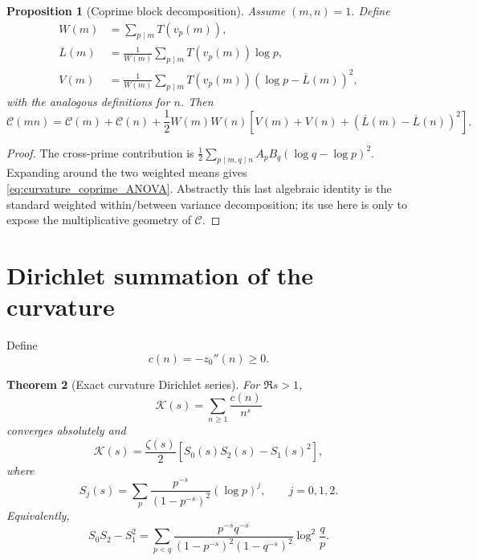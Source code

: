 \documentclass[11pt]{amsart}
\numberwithin{equation}{section}
\theoremstyle{plain}
\newtheorem{theorem}{Theorem}[section]
\newtheorem{proposition}[theorem]{Proposition}
\theoremstyle{definition}
\theoremstyle{remark}
\begin{document}
\begin{proposition}[Coprime block decomposition]
\label{prop:curvature_coprime_decomposition}
Assume \((m,n)=1\).  Define
\begin{align}
W(m)&=\sum_{p\mid m}T(v_p(m)),\\
\overline L(m)&=\frac1{W(m)}\sum_{p\mid m}T(v_p(m))\log p,\\
V(m)&=\frac1{W(m)}\sum_{p\mid m}T(v_p(m))
(\log p-\overline L(m))^2,
\end{align}
with the analogous definitions for \(n\).  Then
\begin{equation}
\boxed{
\mathcal C(mn)=\mathcal C(m)+\mathcal C(n)
+\frac12W(m)W(n)\left[V(m)+V(n)+(\overline L(m)-\overline L(n))^2\right].}
\label{eq:curvature_coprime_ANOVA}
\end{equation}
\end{proposition}

\begin{proof}
The cross-prime contribution is
\(\frac12\sum_{p\mid m,q\mid n}A_pB_q(\log q-\log p)^2\).
Expanding around the two weighted means gives
\eqref{eq:curvature_coprime_ANOVA}.  Abstractly this last algebraic identity
is the standard weighted within/between variance decomposition; its use here
is only to expose the multiplicative geometry of \(\mathcal C\).
\end{proof}

\section{Dirichlet summation of the curvature}
\label{sec:curvature_dirichlet_series}

Define
\begin{equation}
c(n)=-z_0''(n)\ge0.
\label{eq:cn_curvature}
\end{equation}

\begin{theorem}[Exact curvature Dirichlet series]
\label{thm:curvature_dirichlet_series}
For \(\Re s>1\),
\begin{equation}
\mathcal K(s)=\sum_{n\ge1}\frac{c(n)}{n^s}
\label{eq:K_dirichlet_definition}
\end{equation}
converges absolutely and
\begin{equation}
\boxed{
\mathcal K(s)=\frac{\zeta(s)}2\left[S_0(s)S_2(s)-S_1(s)^2\right],}
\label{eq:K_variance_determinant}
\end{equation}
where
\begin{equation}
S_j(s)=\sum_p\frac{p^{-s}}{(1-p^{-s})^2}(\log p)^j,
\qquad j=0,1,2.
\label{eq:Sj_prime_sum}
\end{equation}
Equivalently,
\begin{equation}
S_0S_2-S_1^2
=\sum_{p<q}
\frac{p^{-s}q^{-s}}{(1-p^{-s})^2(1-q^{-s})^2}
\log^2\!\frac qp.
\label{eq:weighted_prime_variance}
\end{equation}
\end{theorem}
\end{document}
